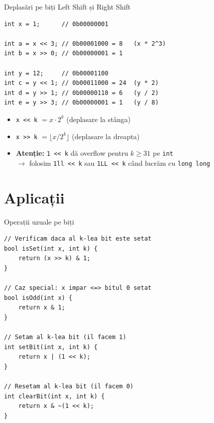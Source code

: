 \documentclass{beamer}
\begin{document}
\begin{frame}{Deplasări pe biți \textemdash{} Left Shift și Right Shift}
  \begin{center}
  \begin{lstlisting}
int x = 1;      // 0b00000001

int a = x << 3; // 0b00001000 = 8   (x * 2^3)
int b = x >> 0; // 0b00000001 = 1

int y = 12;     // 0b00001100
int c = y << 1; // 0b00011000 = 24  (y * 2)
int d = y >> 1; // 0b00000110 = 6   (y / 2)
int e = y >> 3; // 0b00000001 = 1   (y / 8)
  \end{lstlisting}
  \end{center}
  \begin{itemize}
    \item \lstinline|x << k| $= x \cdot 2^k$ \quad (deplasare la stânga)
    \item \lstinline|x >> k| $= \lfloor x / 2^k \rfloor$ \quad (deplasare la dreapta)
    \item \textbf{Atenție:} \lstinline|1 << k| dă overflow pentru $k \geq 31$ pe \lstinline|int| \\
      $\rightarrow$ folosim \lstinline|1ll << k| sau \lstinline|1LL << k| când lucrăm cu \lstinline|long long|
  \end{itemize}
\end{frame}

\section{Aplicații}

\begin{frame}[fragile]{Operații uzuale pe biți}
  \begin{lstlisting}
// Verificam daca al k-lea bit este setat
bool isSet(int x, int k) {
    return (x >> k) & 1;
}

// Caz special: x impar <=> bitul 0 setat
bool isOdd(int x) {
    return x & 1;
}

// Setam al k-lea bit (il facem 1)
int setBit(int x, int k) {
    return x | (1 << k);
}

// Resetam al k-lea bit (il facem 0)
int clearBit(int x, int k) {
    return x & ~(1 << k);
}
  \end{lstlisting}
\end{frame}
\end{document}
